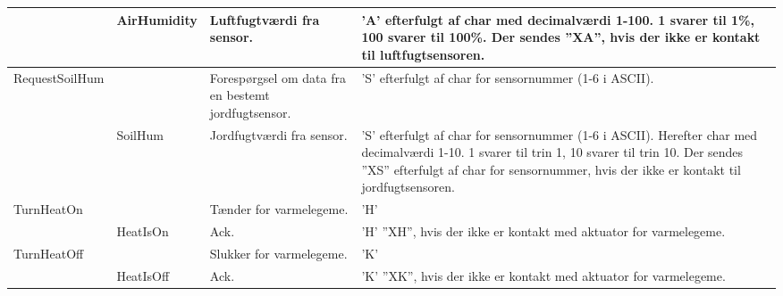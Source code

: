 \begin{longtable}{| L{2.5cm} | L{2.3cm} | L{4cm} | >{\raggedright\arraybackslash}X |}
    ~                                 & AirHumidity                   & Luftfugtværdi fra sensor.                           & ’A’ efterfulgt af char med decimalværdi 1-100. 1 svarer til 1\%, 100 svarer til 100\%. Der sendes ”XA”, hvis der ikke er kontakt til luftfugtsensoren.                                                                                      \\ \hline
    RequestSoilHum                    & ~                             & Forespørgsel om data fra en bestemt jordfugtsensor. & ’S’ efterfulgt af char for sensornummer (1-6 i ASCII).                                                                                                                                                                                        \\ \hline
    ~                                 & SoilHum                       & Jordfugtværdi fra sensor.                           & ’S’ efterfulgt af char for sensornummer (1-6 i ASCII). Herefter char med decimalværdi 1-10. 1 svarer til trin 1, 10 svarer til trin 10. Der sendes ”XS” efterfulgt af char for sensornummer, hvis der ikke er kontakt til jordfugtsensoren. \\ \hline
    TurnHeatOn                        & ~                             & Tænder for varmelegeme.                             & ’H’                                                                                                                                                                                                                                           \\ \hline
    ~                                 & HeatIsOn                      & Ack.                                                & ’H’ \newline ”XH”, hvis der ikke er kontakt med aktuator for varmelegeme.                                                                                                                                                                             \\ \hline
    TurnHeatOff                       & ~                             & Slukker for varmelegeme.                            & ’K’                                                                                                                                                                                                                                           \\ \hline
    ~                                 & HeatIsOff                     & Ack.                                                & ’K’ \newline ”XK”, hvis der ikke er kontakt med aktuator for varmelegeme.                                                                                                                                                                             \\ \hline

\end{longtable}

